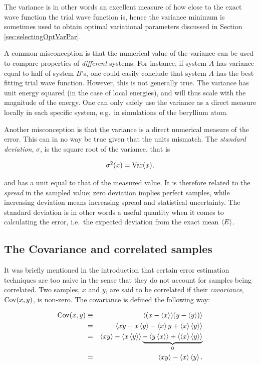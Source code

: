 The variance is in other words an excellent measure of how close to the exact wave function the trial wave function is, hence the variance minimum is sometimes used to obtain optimal variational parameters discussed in Section \ref{sec:selectingOptVarPar}. 

A common misconception is that the numerical value of the variance can be used to compare properties of \textit{different} systems. For instance, if system $A$ has variance equal to half of system $B$'s, one could easily conclude that system $A$ has the best fitting trial wave function. However, this is not generally true. The variance has unit energy squared (in the case of local energies), and will thus scale with the magnitude of the energy. One can only safely use the variance as a direct measure locally in each specific system, e.g.~in simulations of the beryllium atom.

Another misconception is that the variance is a direct numerical measure of the error. This can in no way be true given that the units mismatch. The \textit{standard deviation}, $\sigma$, is the square root of the variance, that is

\begin{equation}
\label{eq:stdNaive}
 \sigma^2(x) = \mathrm{Var}(x),
\end{equation}


and has a unit equal to that of the measured value. It is therefore related to the \textit{spread} in the sampled value; zero deviation implies perfect samples, while increasing deviation means increasing spread and statistical uncertainty. The standard deviation is in other words a useful quantity when it comes to calculating the error, i.e.~the expected deviation from the exact mean $\left< E \right>$.

\subsection{The Covariance and correlated samples}

It was briefly mentioned in the introduction that certain error estimation techniques are too naive in the sense that they do not account for samples being correlated. Two samples, $x$ and $y$, are said to be correlated if their \textit{covariance}, $\mathrm{Cov}(x, y)$, is non-zero. The covariance is defined the following way:

\begin{eqnarray}
\label{eq:covariance}
 \mathrm{Cov}(x, y) &\equiv& \left< (x - \left< x \right>)(y - \left< y \right>) \right> \nonumber\\
            &=& \left< xy - x\left< y \right> - \left< x \right>y + \left< x \right>\left< y \right> \right> \nonumber\\
            &=& \left< xy \right> - \left< x\left< y \right> \right> \underbrace{-\left< y\left< x \right> \right> + \left< \left< x \right>\left< y \right> \right>}_{0} \nonumber\\
            &=& \left< xy \right> - \left< x \right>\left< y \right>.
\end{eqnarray}

